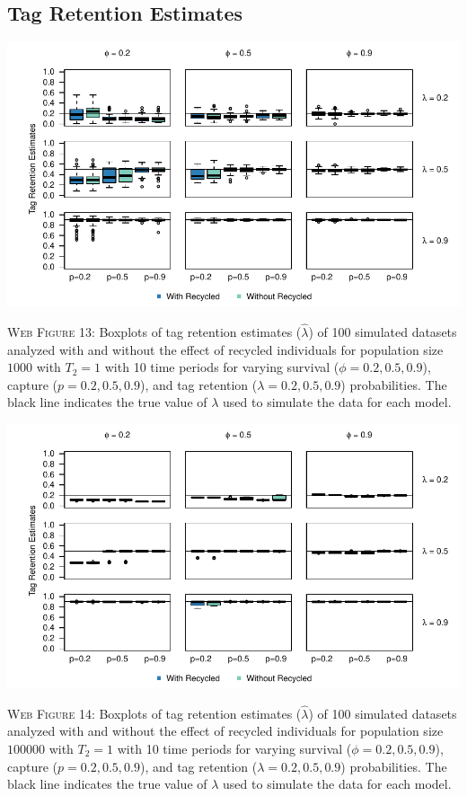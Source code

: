\documentclass[]{article}
\begin{document}
\newpage

\subsection{Tag Retention Estimates}\label{tag-retention-estimates}

\includegraphics{Appendix_files/figure-latex/13_tagretention_GJSTL1-1.pdf}

\textsc{Web Figure 13:} Boxplots of tag retention estimates
(\(\hat{\lambda}\)) of 100 simulated datasets analyzed with and without
the effect of recycled individuals for population size \(1000\) with
\(T_2=1\) with 10 time periods for varying survival
(\(\phi=0.2,0.5,0.9\)), capture (\(p=0.2,0.5,0.9\)), and tag retention
(\(\lambda=0.2,0.5,0.9\)) probabilities. The black line indicates the
true value of \(\lambda\) used to simulate the data for each model.

\includegraphics{Appendix_files/figure-latex/14_tagretention_GJSTL2-1.pdf}

\textsc{Web Figure 14:} Boxplots of tag retention estimates
(\(\hat{\lambda}\)) of 100 simulated datasets analyzed with and without
the effect of recycled individuals for population size \(100000\) with
\(T_2=1\) with 10 time periods for varying survival
(\(\phi=0.2,0.5,0.9\)), capture (\(p=0.2,0.5,0.9\)), and tag retention
(\(\lambda=0.2,0.5,0.9\)) probabilities. The black line indicates the
true value of \(\lambda\) used to simulate the data for each model.
\end{document}
